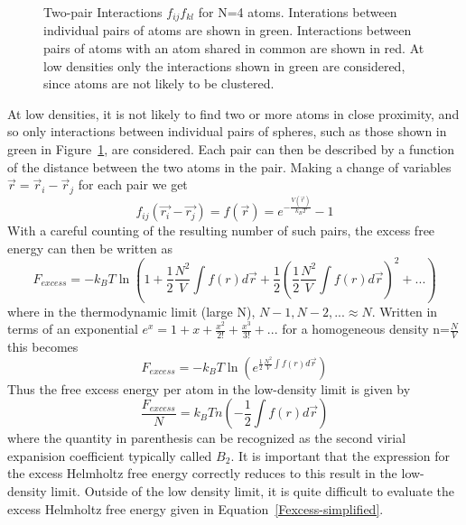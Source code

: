 \documentclass[double,12pt]{beavtex}
\begin{document}
  \begin{figure}[h!]
    \centering
    \caption{Two-pair Interactions $f_{ij}f_{kl}$ for N=4 atoms. Interations between individual pairs of atoms are shown in green. 
             Interactions between pairs of atoms with an atom shared in common are shown in red. 
             At low densities only the interactions shown in green are considered, since atoms are not likely to be clustered.}
    \label{fig:diagrammic}
  \end{figure}

At low densities, it is not likely to find two or more atoms in close proximity, and so only interactions between individual pairs of spheres, such as those shown in green in Figure~\ref{fig:diagrammic}, are considered.
Each pair can then be described by a function of the distance between the two atoms in the pair. Making a change of variables $\vec{r}=\vec{r}_i-\vec{r}_j $ for each pair we get 
\begin{equation}f_{ij}(\vec{r_i}-\vec{r_j})=f(\vec{r})=e^{-\frac{V(\vec{r})}{k_BT}}-1\end{equation} 
\color{black}
With a careful counting of the resulting number of such pairs, the excess free energy can then be written as 
\begin{equation}{F_{excess}=-k_BT\ln\left(1+\frac{1}{2}\frac{N^2}{V}\int{f(r)}{d\vec{r}}+\frac{1}{2}\left(\frac{1}{2}\frac{N^2}{V}\int{f(r)}{d\vec{r}}\right)^2+ ...\right)}\end{equation}
where in the thermodynamic limit (large N), $N-1, N-2, ...\approx{N}$. 
Written in terms of an exponential $e^x=1+x+\frac{x^2}{2!}+\frac{x^3}{3!}+ ...$ for a homogeneous density n=$\frac{N}{V}$ this becomes
\begin{equation}{F_{excess}=-k_BT\ln{\left(e^{\frac{1}{2}\frac{N^2}{V}\int{f(r)}{d\vec{r}}}\right)}}\end{equation} 
Thus the free excess energy per atom in the low-density limit is given by 
\begin{equation}{\frac{F_{excess}}{N}=k_BTn\left(-\frac{1}{2}\int{f(r)}{d\vec{r}}\right)}\end{equation} where the quantity in parenthesis can be recognized 
as the second virial expanision coefficient typically called $B_2$. %
It is important that the expression for the excess Helmholtz free energy correctly reduces to this result in the low-density limit. 
Outside of the low density limit, it is quite difficult to evaluate the excess Helmholtz free energy given in Equation~\ref{Fexcess-simplified}. 
\end{document}

